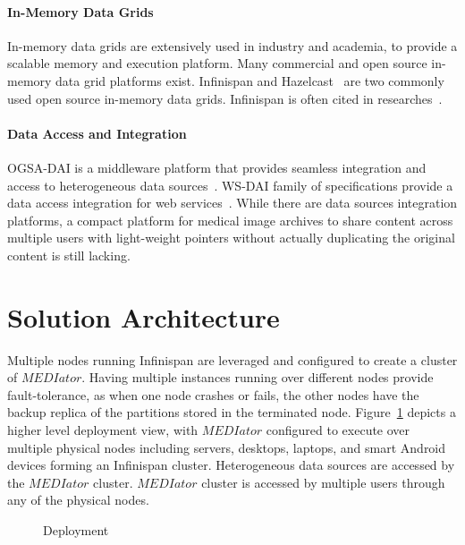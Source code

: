 \documentclass[conference]{IEEEtran}
\begin{document}
\paragraph*{\textbf{In-Memory Data Grids}}
In-memory data grids are extensively used in industry and academia, to provide a scalable memory and execution platform. Many commercial and open source in-memory data grid platforms exist. Infinispan and Hazelcast~\cite{hazelcast} are two commonly used open source in-memory data grids. Infinispan is often cited in researches~\cite{palmieri2012integrated,rosa2011goal,ruivo2011exploiting}.

\paragraph*{\textbf{Data Access and Integration}}
OGSA-DAI is a middleware platform that provides seamless integration and access to heterogeneous data sources~\cite{antonioletti2005design}. WS-DAI family of specifications provide a data access integration for web services~\cite{antonioletti2006ws}. While there are data sources integration platforms, a compact platform for medical image archives to share content across multiple users with light-weight pointers without actually duplicating the original content is still lacking.


\section{Solution Architecture}

Multiple nodes running Infinispan are leveraged and configured to create a cluster of $MEDIator$. Having multiple instances running over different nodes provide fault-tolerance, as when one node crashes or fails, the other nodes have the backup replica of the partitions stored in the terminated node. Figure~\ref{fig:deployment} depicts a higher level deployment view, with $MEDIator$ configured to execute over multiple physical nodes including servers, desktops, laptops, and smart Android devices forming an Infinispan cluster. Heterogeneous data sources are accessed by the $MEDIator$ cluster. $MEDIator$ cluster is accessed by multiple users through any of the physical nodes.
\begin{figure}[!h]
\begin{center}
  \vspace{-15pt}
\end{center}
 \caption{Deployment}
 \label{fig:deployment}
 \vspace{-18pt}
\end{figure}
\end{document}
